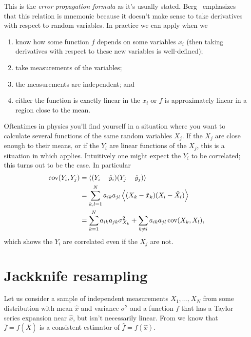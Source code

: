 This is the {\it error propagation formula} as it's usually stated. 
Berg~\cite{berg_markov_2004} emphasizes that this relation is 
mnemonic because it doesn't make 
sense to take derivatives with respect to random variables. 
In practice we can apply  when we
\begin{enumerate}
  \item know how some function $f$ depends on some variables $x_i$
        (then taking derivatives with respect to these new variables
         is well-defined);
  \item take measurements of the variables;
  \item the measurements are independent; and
  \item either the function is exactly linear in the $x_i$ or $f$ is
        approximately linear in a region close to the mean.
\end{enumerate}

Oftentimes in physics you'll find yourself in a situation where you want
to calculate several functions of the same random variables $X_j$. If
the $X_j$ are close enough to their means, or if the $Y_i$ are linear
functions of the $X_j$, this is a situation in which  
applies. Intuitively one might expect the $Y_i$ to be correlated; this
turns out to be the case. In particular
\begin{equation}
  \begin{aligned}
    \Cov(Y_i,Y_j)&=\ev{(Y_i-\hat{y}_i)(Y_j-\hat{y}_j)}\\
                 &=\sum_{k,l=1}^N 
                  a_{ik}a_{jl}\ev{(X_k-\hat{x}_k)(X_l-\hat{X}_l)}\\
                 &=\sum_{k=1}^N a_{ik}a_{jk}\sigma^2_{X_k}
                   +\sum_{k\neq l} a_{ik}a_{jl}\Cov(X_k,X_l),
  \end{aligned}
\end{equation}
which shows the $Y_i$ are correlated even if the $X_j$ are not.

\section{Jackknife resampling}
Let us consider a sample of independent measurements 
$X_1,...,X_N$ from some distribution with mean $\hat{x}$ and 
variance $\sigma^2$ and a function $f$ that has a Taylor series 
expansion near $\hat{x}$, but isn't necessarily linear.
From  we know that $\bar{f}=f(\bar{X})$ is
a consistent estimator of $\hat{f}=f(\hat{x})$. 

